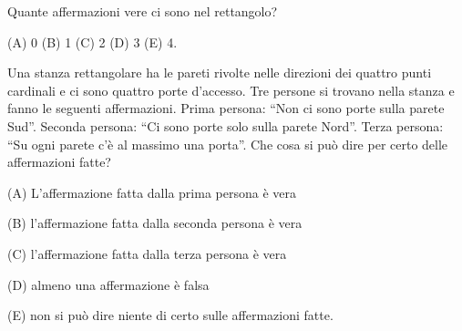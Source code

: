 \begin{esercizio}
    \label{ex:archimede_2003_biennio_14}


    Quante affermazioni vere ci sono nel rettangolo?

    (A) 0 \quad (B) 1 \quad (C) 2 \quad (D) 3 \quad (E) 4.
\end{esercizio}

\begin{esercizio}
    \label{ex:archimede_2005_biennio_6}
    Una stanza rettangolare ha le pareti rivolte nelle direzioni dei quattro punti cardinali e ci sono quattro porte
    d’accesso.
    Tre persone si trovano nella stanza e fanno le seguenti affermazioni.
    Prima persona: “Non ci sono porte sulla parete Sud”.
    Seconda persona: “Ci sono porte solo sulla parete Nord”.
    Terza persona: “Su ogni parete c’è al massimo una porta”.
    Che cosa si può dire per certo delle affermazioni fatte?

    (A) L’affermazione fatta dalla prima persona è vera

    (B) l’affermazione fatta dalla seconda persona è vera

    (C) l’affermazione fatta dalla terza persona è vera

    (D) almeno una affermazione è falsa

    (E) non si può dire niente di certo sulle affermazioni fatte.
\end{esercizio}

